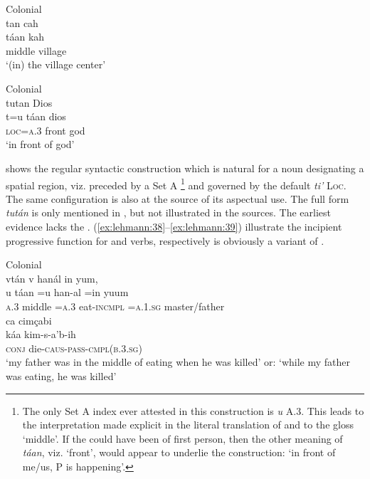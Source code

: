 \documentclass[output=paper]{langsci/langscibook}
\begin{document}
\ea\label{ex:lehmann:36}
Colonial   \\
       tan    cah\\
\gll       táan    kah\\
middle  village\\
\glt ‘(in) the village center’ \citep[§299, p.147]{Beltrán1746} 
\z


\ea\label{ex:lehmann:37}
Colonial  \\
      tutan          Dios\\
\gll   t=u      táan    dios\\
\textsc{loc=a.3}  front    god\\
\glt ‘in front of god’ \citep[39v]{SanBuenaventura1684}
\z



 shows the regular syntactic construction which is natural for a noun designating a spatial region, viz. preceded by a  Set A \footnote{The only Set A index ever attested in this construction is \textit{u} A.3. This leads to the interpretation made explicit in the literal translation of  and to the gloss `middle'. If the  could have been of first person, then the other meaning of \textit{táan}, viz. `front', would appear to underlie the construction: `in front of me/us, P is happening'.} and governed by the default  \textit{ti’} \textsc{Loc}. The same configuration is also at the source of its aspectual use. The full form \textit{tután} is only mentioned in \citealt[47]{Coronel1620}, but not illustrated in the sources. The earliest evidence lacks the . (\ref{ex:lehmann:38}–\ref{ex:lehmann:39}) illustrate the incipient progressive function for  and  verbs, respectively  is obviously a variant of .


\ea\label{ex:lehmann:38}
Colonial  \\
      vtán       v       hanál       in       yum,\\
\gll         u     táan   =u     han-al       =in       yuum\\
\textsc{a.3 }  middle  \textsc{=a.3}    eat-\textsc{incmpl}  =\textsc{a.1.sg}   master/father\\

  ca     cimçabi\\
\gll        káa     kim-s-a’b-ih\\
\textsc{conj}    die-\textsc{caus-pass-cmpl(b.3.sg)}\\
\glt ‘my father was in the middle of eating when he was killed’ or: ‘while my father was eating, he was killed’ \citep[57]{Coronel1620}
\z
\end{document}
